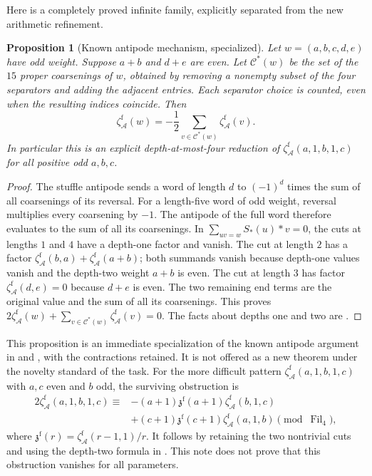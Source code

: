\documentclass[12pt]{amsart}
\newtheorem{prop}[thm]{Proposition}
\theoremstyle{definition}
\theoremstyle{remark}
\numberwithin{equation}{section}
\newcommand{\Fil}{\operatorname{Fil}}
\newcommand{\zf}{\zeta_{\mathcal A}^{\mathrm f}}
\theoremstyle{definition}
\theoremstyle{remark}
\begin{document}
Here is a completely proved infinite family, explicitly separated from
the new arithmetic refinement.
\begin{prop}[Known antipode mechanism, specialized]\label{en:depthfamily}
Let $w=(a,b,c,d,e)$ have odd weight. Suppose $a+b$ and $d+e$ are even.
Let $\mathcal C^*(w)$ be the set of the $15$ proper coarsenings of $w$,
obtained by removing a nonempty subset of the four separators and adding
the adjacent entries. Each separator choice is counted, even when the
resulting indices coincide. Then
\[
 \zf(w)=-\frac12\sum_{v\in\mathcal C^*(w)}\zf(v).
\]
In particular this is an explicit depth-at-most-four reduction of
$\zf(a,1,b,1,c)$ for all positive odd $a,b,c$.
\end{prop}
\begin{proof}
The stuffle antipode sends a word of length $d$ to $(-1)^d$ times
the sum of all coarsenings of its reversal. For a length-five word of
odd weight, reversal multiplies every coarsening by $-1$. The antipode
of the full word therefore evaluates to the sum of all its coarsenings.
In $\sum_{uv=w}S_*(u)*v=0$, the cuts at lengths $1$ and $4$ have a
depth-one factor and vanish. The cut at length $2$ has a factor
$\zf(b,a)+\zf(a+b)$; both summands vanish because depth-one values
vanish and the depth-two weight $a+b$ is even. The cut at length $3$
has factor $\zf(d,e)=0$ because $d+e$ is even. The two remaining end
terms are the original value and the sum of all its coarsenings. This
proves $2\zf(w)+\sum_{v\in\mathcal C^*(w)}\zf(v)=0$.
The facts about depths one and two are \cite[Proposition 3.3]{BR}.
\end{proof}
This proposition is an immediate specialization of the known antipode
argument in \cite[Theorem 4.1]{BR} and \cite[\S6, Proposition 6]{KZ},
with the contractions retained. It is not offered as a new theorem under
the novelty standard of the task. For the more difficult pattern
$\zf(a,1,b,1,c)$ with $a,c$ even and $b$ odd, the surviving obstruction is
\[
 \begin{split}
 2\zf(a,1,b,1,c)\equiv{}&-(a+1)\mathfrak z^{\mathrm f}(a+1)
                         \zf(b,1,c)\\
 &+(c+1)\mathfrak z^{\mathrm f}(c+1)\zf(a,1,b)
 \pmod{\Fil_4},
 \end{split}
\]
where $\mathfrak z^{\mathrm f}(r)=\zf(r-1,1)/r$.
It follows by retaining the two nontrivial cuts and using the depth-two
formula in \cite[Proposition 3.3]{BR}. This note does not prove that
this obstruction vanishes for all parameters.
\end{document}
